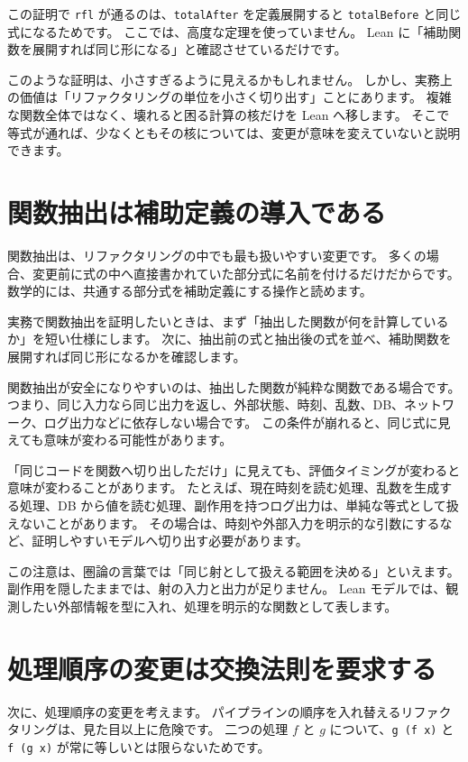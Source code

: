 この証明で \texttt{rfl} が通るのは、\texttt{totalAfter} を定義展開すると \texttt{totalBefore} と同じ式になるためです。
ここでは、高度な定理を使っていません。
Lean に「補助関数を展開すれば同じ形になる」と確認させているだけです。

このような証明は、小さすぎるように見えるかもしれません。
しかし、実務上の価値は「リファクタリングの単位を小さく切り出す」ことにあります。
複雑な関数全体ではなく、壊れると困る計算の核だけを Lean へ移します。
そこで等式が通れば、少なくともその核については、変更が意味を変えていないと説明できます。

\section{関数抽出は補助定義の導入である}

関数抽出は、リファクタリングの中でも最も扱いやすい変更です。
多くの場合、変更前に式の中へ直接書かれていた部分式に名前を付けるだけだからです。
数学的には、共通する部分式を補助定義にする操作と読めます。

実務で関数抽出を証明したいときは、まず「抽出した関数が何を計算しているか」を短い仕様にします。
次に、抽出前の式と抽出後の式を並べ、補助関数を展開すれば同じ形になるかを確認します。

関数抽出が安全になりやすいのは、抽出した関数が純粋な関数である場合です。
つまり、同じ入力なら同じ出力を返し、外部状態、時刻、乱数、DB、ネットワーク、ログ出力などに依存しない場合です。
この条件が崩れると、同じ式に見えても意味が変わる可能性があります。

「同じコードを関数へ切り出しただけ」に見えても、評価タイミングが変わると意味が変わることがあります。
たとえば、現在時刻を読む処理、乱数を生成する処理、DB から値を読む処理、副作用を持つログ出力は、単純な等式として扱えないことがあります。
その場合は、時刻や外部入力を明示的な引数にするなど、証明しやすいモデルへ切り出す必要があります。

この注意は、圏論の言葉では「同じ射として扱える範囲を決める」といえます。
副作用を隠したままでは、射の入力と出力が足りません。
Lean モデルでは、観測したい外部情報を型に入れ、処理を明示的な関数として表します。

\section{処理順序の変更は交換法則を要求する}

次に、処理順序の変更を考えます。
パイプラインの順序を入れ替えるリファクタリングは、見た目以上に危険です。
二つの処理 \(f\) と \(g\) について、\texttt{g (f x)} と \texttt{f (g x)} が常に等しいとは限らないためです。

